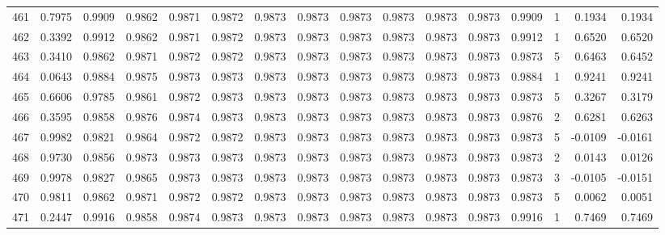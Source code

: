 \begin{tabular}{lrrrrrrrrrrrrrrr}
461 &      0.7975 &  0.9909 &  0.9862 &  0.9871 &  0.9872 &  0.9873 &  0.9873 &  0.9873 &  0.9873 &  0.9873 &   0.9873 &     0.9909 &      1 &                    0.1934 &                     0.1934 \\
462 &      0.3392 &  0.9912 &  0.9862 &  0.9871 &  0.9872 &  0.9873 &  0.9873 &  0.9873 &  0.9873 &  0.9873 &   0.9873 &     0.9912 &      1 &                    0.6520 &                     0.6520 \\
463 &      0.3410 &  0.9862 &  0.9871 &  0.9872 &  0.9872 &  0.9873 &  0.9873 &  0.9873 &  0.9873 &  0.9873 &   0.9873 &     0.9873 &      5 &                    0.6463 &                     0.6452 \\
464 &      0.0643 &  0.9884 &  0.9875 &  0.9873 &  0.9873 &  0.9873 &  0.9873 &  0.9873 &  0.9873 &  0.9873 &   0.9873 &     0.9884 &      1 &                    0.9241 &                     0.9241 \\
465 &      0.6606 &  0.9785 &  0.9861 &  0.9872 &  0.9873 &  0.9873 &  0.9873 &  0.9873 &  0.9873 &  0.9873 &   0.9873 &     0.9873 &      5 &                    0.3267 &                     0.3179 \\
466 &      0.3595 &  0.9858 &  0.9876 &  0.9874 &  0.9873 &  0.9873 &  0.9873 &  0.9873 &  0.9873 &  0.9873 &   0.9873 &     0.9876 &      2 &                    0.6281 &                     0.6263 \\
467 &      0.9982 &  0.9821 &  0.9864 &  0.9872 &  0.9872 &  0.9873 &  0.9873 &  0.9873 &  0.9873 &  0.9873 &   0.9873 &     0.9873 &      5 &                   -0.0109 &                    -0.0161 \\
468 &      0.9730 &  0.9856 &  0.9873 &  0.9873 &  0.9873 &  0.9873 &  0.9873 &  0.9873 &  0.9873 &  0.9873 &   0.9873 &     0.9873 &      2 &                    0.0143 &                     0.0126 \\
469 &      0.9978 &  0.9827 &  0.9865 &  0.9873 &  0.9873 &  0.9873 &  0.9873 &  0.9873 &  0.9873 &  0.9873 &   0.9873 &     0.9873 &      3 &                   -0.0105 &                    -0.0151 \\
470 &      0.9811 &  0.9862 &  0.9871 &  0.9872 &  0.9872 &  0.9873 &  0.9873 &  0.9873 &  0.9873 &  0.9873 &   0.9873 &     0.9873 &      5 &                    0.0062 &                     0.0051 \\
471 &      0.2447 &  0.9916 &  0.9858 &  0.9874 &  0.9873 &  0.9873 &  0.9873 &  0.9873 &  0.9873 &  0.9873 &   0.9873 &     0.9916 &      1 &                    0.7469 &                     0.7469 \\

\end{tabular}

